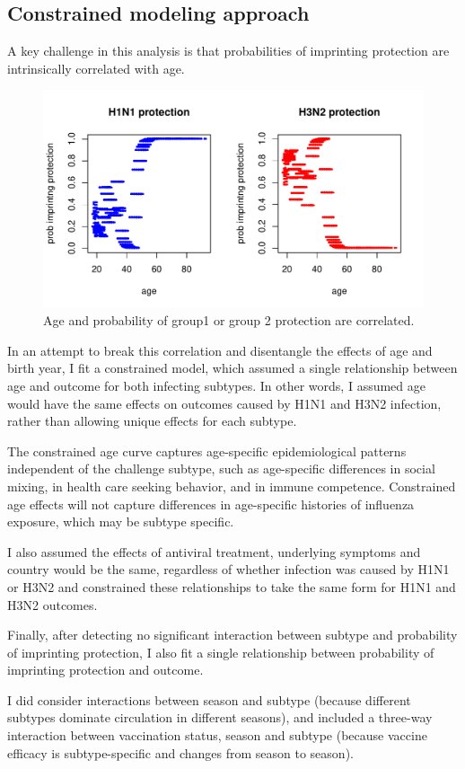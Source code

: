 \documentclass[12pt,twoside]{article}
\begin{document}
\subsection*{Constrained modeling approach}

A key challenge in this analysis is that probabilities of imprinting protection are intrinsically correlated with age. 

\begin{figure}
\centering
\includegraphics{correlation.pdf}
\caption{Age and probability of group1 or group 2 protection are correlated.}
\end{figure}

In an attempt to break this correlation and disentangle the effects of age and birth year, I fit a constrained model, which assumed a single relationship between age and outcome for both infecting subtypes. In other words, I assumed age would have the same effects on outcomes caused by H1N1 and H3N2 infection, rather than allowing unique effects for each subtype.

The constrained age curve captures age-specific epidemiological patterns independent of the challenge subtype, such as age-specific differences in social mixing, in health care seeking behavior, and in immune competence. Constrained age effects will not capture differences in age-specific histories of influenza exposure, which may be subtype specific.

I also assumed the effects of antiviral treatment, underlying symptoms and country would be the same, regardless of whether infection was caused by H1N1 or H3N2 and constrained these relationships to take the same form for H1N1 and H3N2 outcomes.

Finally, after detecting no significant interaction between subtype and probability of imprinting protection, I also fit a single relationship between probability of imprinting protection and outcome.

I did consider interactions between season and subtype (because different subtypes dominate circulation in different seasons), and included a three-way interaction between vaccination status, season and subtype (because vaccine efficacy is subtype-specific and changes from season to season).
\end{document}
